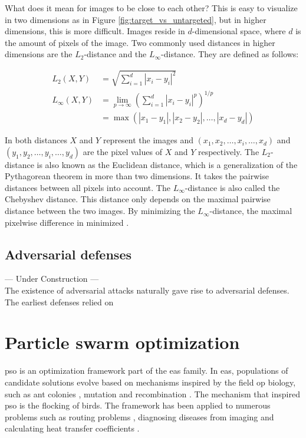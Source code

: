 What does it mean for images to be close to each other? This is easy to visualize in two dimensions as in Figure \ref{fig:target_vs_untargeted}, but in higher dimensions, this is more difficult. Images reside in $d$-dimensional space, where $d$ is the amount of pixels of the image. Two commonly used distances in higher dimensions are the $L_2$-distance and the $L_\infty$-distance. They are defined as follows:

\begin{align*}
L_2(X, Y) &= \sqrt{\sum_{i=1}^d|x_i - y_i|^2} \\
L_\infty(X, Y) &= \lim_{p\rightarrow \infty}\left( \sum_{i=1}^d|x_i-y_i|^p\right)^{1/p} \\
&= \max (|x_1 - y_1|, |x_2-y_2|, \ldots, |x_d-y_d|)
\end{align*}

In both distances $X$ and $Y$ represent the images and $(x_1, x_2, \ldots, x_i, \ldots, x_d)$ and $(y_1, y_2, \ldots, y_i, \ldots, y_d)$ are the pixel values of $X$ and $Y$ respectively. The $L_2$-distance is also known as the Euclidean distance, which is a generalization of the Pythagorean theorem in more than two dimensions. It takes the pairwise distances between all pixels into account. The $L_\infty$-distance is also called the Chebyshev distance. This distance only depends on the maximal pairwise distance between the two images. By minimizing the $L_\infty$-distance, the maximal pixelwise difference in minimized \cite{wiki_distances}. 

\subsection{Adversarial defenses}
--- Under Construction ---\\
The existence of adversarial attacks naturally gave rise to adversarial defenses. The earliest defenses relied on 

\section{Particle swarm optimization}
\gls{pso} \cite{pso} is an optimization framework part of the \glspl{ea} family. In \glspl{ea}, populations of candidate solutions evolve based on mechanisms inspired by the field op biology, such as ant colonies \cite{aco}, mutation and recombination \cite{genetic_algorithm}. The mechanism that inspired \gls{pso} is the flocking of birds. The framework has been applied to numerous problems such as routing problems \cite{ev_transport, freight_transport}, diagnosing diseases from imaging \cite{leukemia_pso} and calculating heat transfer coefficients \cite{heat_transfer_pso}.\\

